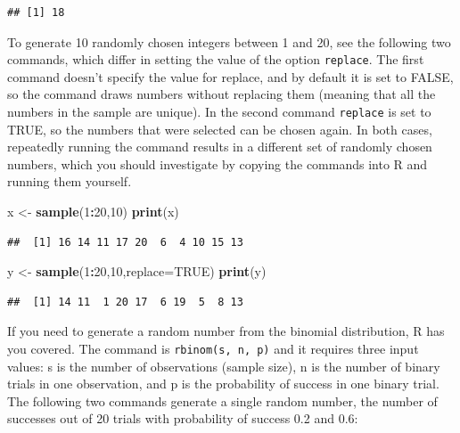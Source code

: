 \documentclass[
]{book}
\newenvironment{Shaded}{\begin{snugshade}}{\end{snugshade}}
\newcommand{\DataTypeTok}[1]{\textcolor[rgb]{0.13,0.29,0.53}{#1}}
\newcommand{\DecValTok}[1]{\textcolor[rgb]{0.00,0.00,0.81}{#1}}
\newcommand{\KeywordTok}[1]{\textcolor[rgb]{0.13,0.29,0.53}{\textbf{#1}}}
\newcommand{\NormalTok}[1]{#1}
\newcommand{\OperatorTok}[1]{\textcolor[rgb]{0.81,0.36,0.00}{\textbf{#1}}}
\newcommand{\OtherTok}[1]{\textcolor[rgb]{0.56,0.35,0.01}{#1}}
\newcommand{\StringTok}[1]{\textcolor[rgb]{0.31,0.60,0.02}{#1}}
\theoremstyle{definition}
\theoremstyle{definition}
\theoremstyle{definition}
\theoremstyle{remark}
\begin{document}
\begin{verbatim}
## [1] 18
\end{verbatim}

To generate 10 randomly chosen integers between 1 and 20, see the following two commands, which differ in setting the value of the option \texttt{replace}. The first command doesn't specify the value for replace, and by default it is set to FALSE, so the command draws numbers without replacing them (meaning that all the numbers in the sample are unique). In the second command \texttt{replace} is set to TRUE, so the numbers that were selected can be chosen again. In both cases, repeatedly running the command results in a different set of randomly chosen numbers, which you should investigate by copying the commands into R and running them yourself.

\begin{Shaded}
\begin{Highlighting}[]
\NormalTok{x \textless{}{-}}\StringTok{ }\KeywordTok{sample}\NormalTok{(}\DecValTok{1}\OperatorTok{:}\DecValTok{20}\NormalTok{,}\DecValTok{10}\NormalTok{)}
\KeywordTok{print}\NormalTok{(x)}
\end{Highlighting}
\end{Shaded}

\begin{verbatim}
##  [1] 16 14 11 17 20  6  4 10 15 13
\end{verbatim}

\begin{Shaded}
\begin{Highlighting}[]
\NormalTok{y \textless{}{-}}\StringTok{ }\KeywordTok{sample}\NormalTok{(}\DecValTok{1}\OperatorTok{:}\DecValTok{20}\NormalTok{,}\DecValTok{10}\NormalTok{,}\DataTypeTok{replace=}\OtherTok{TRUE}\NormalTok{)}
\KeywordTok{print}\NormalTok{(y)}
\end{Highlighting}
\end{Shaded}

\begin{verbatim}
##  [1] 14 11  1 20 17  6 19  5  8 13
\end{verbatim}

If you need to generate a random number from the binomial distribution, R has you covered. The command is \texttt{rbinom(s,\ n,\ p)} and it requires three input values: s is the number of observations (sample size), n is the number of binary trials in one observation, and p is the probability of success in one binary trial. The following two commands generate a single random number, the number of successes out of 20 trials with probability of success 0.2 and 0.6:
\end{document}
